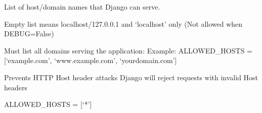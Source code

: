 \documentclass[letterpaper,10pt,english]{sphinxmanual}
\begin{document}

\begin{fulllineitems}
\label{\detokenize{softwareProject:softwareProject.settings.ALLOWED_HOSTS}}
\pysigstartsignatures
\pysigline
{}
\pysigstopsignatures
\sphinxAtStartPar
List of host/domain names that Django can serve.
\begin{description}
\sphinxAtStartPar
Empty list means localhost/127.0.0.1 and ‘localhost’ only
(Not allowed when DEBUG=False)

\sphinxAtStartPar
Must list all domains serving the application:
Example: ALLOWED\_HOSTS = {[}‘example.com’, ‘www.example.com’, ‘your\sphinxhyphen{}domain.com’{]}

\sphinxAtStartPar
Prevents HTTP Host header attacks
Django will reject requests with invalid Host headers

\sphinxAtStartPar
ALLOWED\_HOSTS = {[}‘*’{]}

\end{description}

\end{fulllineitems}

\end{document}
